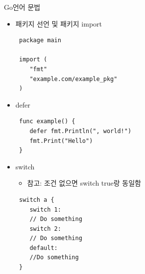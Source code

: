 \documentclass{beamer}
\begin{document}
\begin{frame}{Go언어 문법}
\begin{itemize}
    \item 패키지 선언 및 패키지 import
\begin{lstlisting}
 package main

 import (
    "fmt"
    "example.com/example_pkg"
 )
\end{lstlisting}

    \framebreak

    \item defer
\begin{lstlisting}
 func example() {
    defer fmt.Println(", world!")
    fmt.Print("Hello")
 }
\end{lstlisting}

    \item switch
    \begin{itemize}
     \item 참고: 조건 없으면 switch true랑 동일함
    \end{itemize}

\begin{lstlisting}
 switch a {
    switch 1:
    // Do something
    switch 2:
    // Do something
    default:
    //Do something
 }
\end{lstlisting}

  \end{itemize}
 \end{frame}
\end{document}
